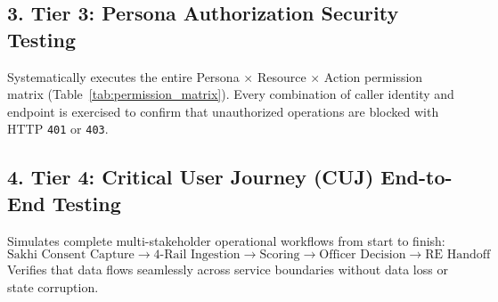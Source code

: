 \subsection{3. Tier 3: Persona Authorization Security Testing}
Systematically executes the entire Persona $\times$ Resource $\times$ Action permission matrix (Table~\ref{tab:permission_matrix}). Every combination of caller identity and endpoint is exercised to confirm that unauthorized operations are blocked with HTTP \texttt{401} or \texttt{403}.

\subsection{4. Tier 4: Critical User Journey (CUJ) End-to-End Testing}
Simulates complete multi-stakeholder operational workflows from start to finish:
$$\text{Sakhi Consent Capture} \longrightarrow \text{4-Rail Ingestion} \longrightarrow \text{Scoring} \longrightarrow \text{Officer Decision} \longrightarrow \text{RE Handoff}$$
Verifies that data flows seamlessly across service boundaries without data loss or state corruption.
